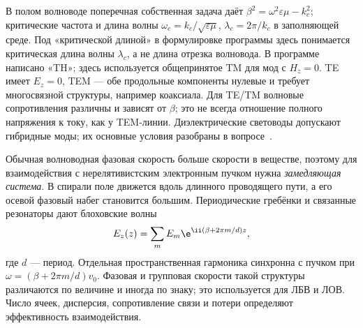 
В полом волноводе поперечная собственная задача даёт $\beta^2=\omega^2\varepsilon\mu-k_c^2$; критические частота и длина волны $\omega_c=k_c/\sqrt{\varepsilon\mu}$, $\lambda_c=2\pi/k_c$ в заполняющей среде. Под «критической длиной» в формулировке программы здесь понимается критическая длина волны $\lambda_c$, а не длина отрезка волновода. В программе написано «TH»; здесь используется общепринятое TM для мод с $H_z=0$. TE имеет $E_z=0$, TEM — обе продольные компоненты нулевые и требует многосвязной структуры, например коаксиала. Для TE/TM волновые сопротивления различны и зависят от $\beta$; это не всегда отношение полного напряжения к току, как у TEM-линии. Диэлектрические световоды допускают гибридные моды; их основные условия разобраны в вопросе~.

Обычная волноводная фазовая скорость больше скорости в веществе, поэтому для взаимодействия с нерелятивистским электронным пучком нужна \emph{замедляющая система}. В спирали поле движется вдоль длинного проводящего пути, а его осевой фазовый набег становится большим. Периодические гребёнки и связанные резонаторы дают блоховские волны
\begin{equation}
 E_z(z)=\sum_m E_m\e^{\ii(\beta+2\pi m/d)z},
\end{equation}
где $d$ — период. Отдельная пространственная гармоника синхронна с пучком при $\omega=(\beta+2\pi m/d)v_0$. Фазовая и групповая скорости такой структуры различаются по величине и иногда по знаку; это используется для ЛБВ и ЛОВ. Число ячеек, дисперсия, сопротивление связи и потери определяют эффективность взаимодействия.

